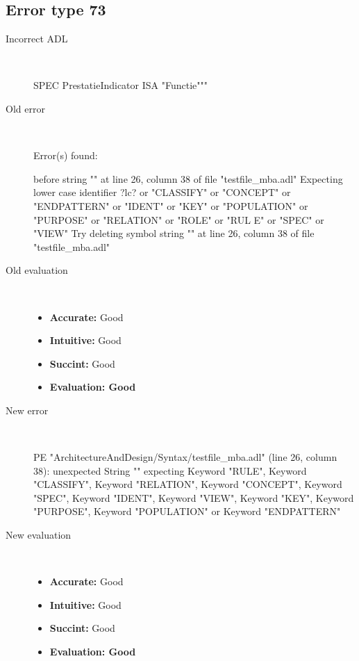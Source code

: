 \hrulefill

\subsection{Error type 73}
  \begin{description}
  \item[Incorrect ADL]~\\
\begin{adl}
SPEC PrestatieIndicator ISA "Functie"""\end{adl}
  \item[Old error]~\\
\begin{haskell}
Error(s) found:

before string "" at line 26, column 38 of file "testfile_mba.adl"
Expecting lower case identifier ?lc? or "CLASSIFY" or "CONCEPT" or "ENDPATTERN"
or "IDENT" or "KEY" or "POPULATION" or "PURPOSE" or "RELATION" or "ROLE" or "RUL
E" or "SPEC" or "VIEW"
Try deleting symbol string "" at line 26, column 38 of file "testfile_mba.adl"\end{haskell}
  \item[Old evaluation]~\\
    \begin{itemize}
    \item \textbf{Accurate:} Good
    \item \textbf{Intuitive:} Good
    \item \textbf{Succint:} Good
    \item \textbf{Evaluation: Good}
    \end{itemize}
  \item[New error]~\\
\begin{haskell}
PE "ArchitectureAndDesign/Syntax/testfile_mba.adl" (line 26, column 38):
unexpected String ""
expecting Keyword "RULE", Keyword "CLASSIFY", Keyword "RELATION", Keyword "CONCEPT", Keyword "SPEC", Keyword "IDENT", Keyword "VIEW", Keyword "KEY", Keyword "PURPOSE", Keyword "POPULATION" or Keyword "ENDPATTERN"\end{haskell}
  \item[New evaluation]~\\
    \begin{itemize}
    \item \textbf{Accurate:} Good
    \item \textbf{Intuitive:} Good
    \item \textbf{Succint:} Good
    \item \textbf{Evaluation: Good
}
    \end{itemize}
  \end{description}

